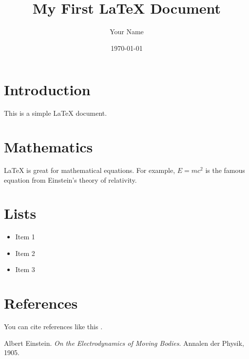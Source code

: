 \documentclass{article}
\title{My First LaTeX Document}
\author{Your Name}
\date{\today}
\begin{document}
\maketitle

\section{Introduction}
This is a simple LaTeX document.

\section{Mathematics}
LaTeX is great for mathematical equations. For example, $E=mc^2$ is the famous equation from Einstein's theory of relativity.

\section{Lists}
\begin{itemize}
  \item Item 1
  \item Item 2
  \item Item 3
\end{itemize}

\section{References}
You can cite references like this \cite{einstein1905}.

\begin{thebibliography}{9}
  Albert Einstein. 
  \textit{On the Electrodynamics of Moving Bodies}.
  Annalen der Physik, 1905.
\end{thebibliography}
\end{document}

